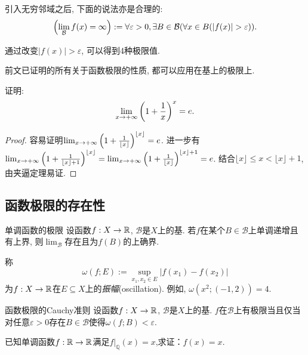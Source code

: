 引入无穷邻域之后, 下面的说法亦是合理的: $$\ssb{\lim_{\mathcal{B}} f(x) = \infty }:=\forall \varepsilon > 0, \exists B \in \mathcal{B} (\forall x \in B (|f(x)|>\varepsilon)).$$

通过改变$|f(x)|>\varepsilon$, 可以得到4种极限值. 

前文已证明的所有关于函数极限的性质, 都可以应用在基上的极限上. 

\begin{example}
	证明: $$\lim_{x\to +\infty} \left( 1+\frac{1}{x} \right)^x = e.$$
\end{example}
\begin{proof}
	容易证明$\lim_{x\to +\infty} \left( 1+\frac{1}{\lfloor x \rfloor} \right)^{\lfloor x \rfloor} = e$. 进一步有$\lim_{x\to +\infty} \left( 1+\frac{1}{\lfloor x \rfloor + 1} \right)^{\lfloor x \rfloor} = \lim_{x\to +\infty} \left( 1+\frac{1}{\lfloor x \rfloor} \right)^{\lfloor x \rfloor + 1} = e$. 结合$\lfloor x \rfloor \leq x < \lfloor x \rfloor +1$, 由夹逼定理易证. 
\end{proof}

\subsection{函数极限的存在性}

\begin{theorem}{单调函数的极限}
	设函数$f:X \to \mathbb{R}$, $\mathcal{B}$是$X$上的基. 若$f$在某个$B \in \mathcal{B}$上单调递增且有上界, 则$\lim_{\mathcal{B}}$存在且为$f(B)$的上确界. 
\end{theorem}

称$$\omega (f;E):=\sup_{x_1,x_2 \in E} |f(x_1)-f(x_2)|$$为$f:X \to \mathbb{R}$在$E \subseteq X$上的\textit{振幅}(oscillation). 例如, $\omega (x^2;(-1,2))=4$. 

\begin{theorem}{函数极限的Cauchy准则}
	设函数$f:X \to \mathbb{R}$, $\mathcal{B}$是$X$上的基. $f$在$\mathcal{B}$上有极限当且仅当对任意$\varepsilon >0$存在$B \in \mathcal{B}$使得$\omega (f;B) < \varepsilon$. 
\end{theorem}




\begin{exercise}
	已知单调函数$f:\mathbb{R} \to \mathbb{R}$满足$f|_{\mathbb{Q}}(x)=x$,求证：$f(x)=x$.
\end{exercise}
